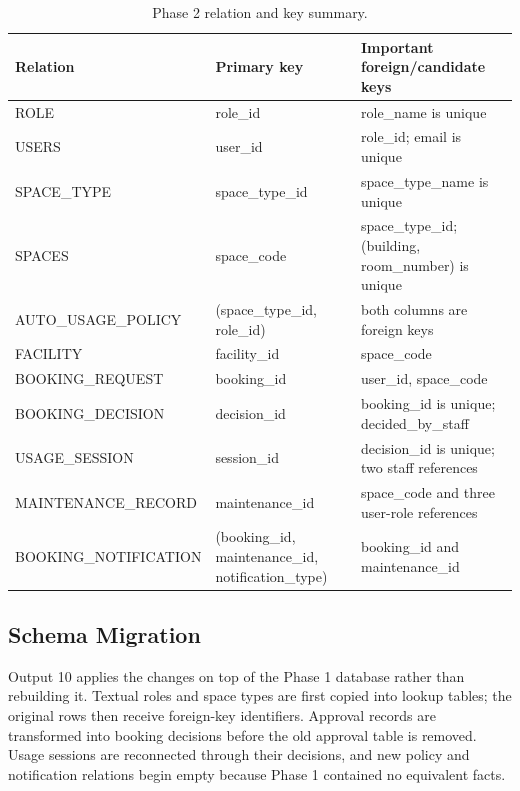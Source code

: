 \begin{table}[H]
  \centering
  \scriptsize
  \begin{tabularx}{\textwidth}{>{\ttfamily\raggedright\arraybackslash}p{3.5cm}>{\raggedright\arraybackslash}p{3.1cm}X}
    \toprule
    \textbf{Relation} & \textbf{Primary key} & \textbf{Important foreign/candidate keys}\\
    \midrule
    ROLE & role\_id & role\_name is unique\\
    USERS & user\_id & role\_id; email is unique\\
    SPACE\_TYPE & space\_type\_id & space\_type\_name is unique\\
    SPACES & space\_code & space\_type\_id; (building, room\_number) is unique\\
    AUTO\_USAGE\_POLICY & (space\_type\_id, role\_id) & both columns are foreign keys\\
    FACILITY & facility\_id & space\_code\\
    BOOKING\_REQUEST & booking\_id & user\_id, space\_code\\
    BOOKING\_DECISION & decision\_id & booking\_id is unique; decided\_by\_staff\\
    USAGE\_SESSION & session\_id & decision\_id is unique; two staff references\\
    MAINTENANCE\_RECORD & maintenance\_id & space\_code and three user-role references\\
    BOOKING\_NOTIFICATION & (booking\_id, maintenance\_id, notification\_type) & booking\_id and maintenance\_id\\
    \bottomrule
  \end{tabularx}
  \caption{Phase 2 relation and key summary.}
  \label{tab:relation-summary}
\end{table}

\subsection{Schema Migration}

Output 10 applies the changes on top of the Phase 1 database rather than rebuilding it. Textual roles and space types are first copied into lookup tables; the original rows then receive foreign-key identifiers. Approval records are transformed into booking decisions before the old approval table is removed. Usage sessions are reconnected through their decisions, and new policy and notification relations begin empty because Phase 1 contained no equivalent facts.

